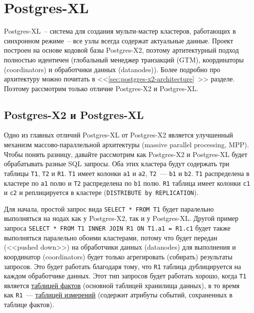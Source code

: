 \section{Postgres-XL}
\label{sec:postgres-xl}

Postgres-XL~-- система для создания мульти-мастер кластеров, работающих в синхронном режиме~-- все узлы всегда содержат актуальные данные. Проект построен на основе кодовой базы Postgres-X2, поэтому артитектурный подход полностью идентичен (глобальный менеджер транзакций (GTM), координаторы (coordinators) и обработчики данных (datanodes)). Более подробно про архитектуру можно почитать в <<\ref{sec:postgres-x2-architecture}~>> разделе. Поэтому рассмотрим только отличие Postgres-X2 и Postgres-XL.


\subsection{Postgres-X2 и Postgres-XL}

Одно из главных отличий Postgres-XL от Postgres-X2 является улучшенный механизм массово-параллельной архитектуры (massive parallel processing, MPP). Чтобы понять разницу, давайте рассмотрим как Postgres-X2 и Postgres-XL будет обрабатывать разные SQL запросы. Оба этих кластера будут содержать три таблицы \lstinline!T1!, \lstinline!T2! и \lstinline!R1!. \lstinline!T1! имеет колонки \lstinline!a1! и \lstinline!a2!, \lstinline!T2!~--- \lstinline!b1! и \lstinline!b2!. \lstinline!T1! распределена в кластере по \lstinline!a1! полю и \lstinline!T2! распределена по \lstinline!b1! полю. \lstinline!R1! таблица имеет колонки \lstinline!c1! и \lstinline!c2! и реплицируется в кластере (\lstinline!DISTRIBUTE by REPLICATION!).

Для начала, простой запрос вида \lstinline!SELECT * FROM T1! будет паралельно выполняться на нодах как у Postgres-X2, так и у Postgres-XL. Другой пример запроса \lstinline!SELECT * FROM T1 INNER JOIN R1 ON T1.a1 = R1.c1! будет также выполняться паралельно обоими кластерами, потому что будет передан (<<pushed down>>) на обработчики данных (datanodes) для выполнения и координатор (coordinators) будет только агрегировать (собирать) результаты запросов. Это будет работать благодаря тому, что \lstinline!R1! таблица дублицируется на каждом обработчике данных. Этот тип запросов будет работать хорошо, когда \lstinline!T1! является \href{https://en.wikipedia.org/wiki/Fact\_table}{таблицей фактов} (основной таблицей хранилища данных), в то время как \lstinline!R1!~--- \href{https://en.wikipedia.org/wiki/Dimension\_(data\_warehouse)#Dimension\_table}{таблицей измерений} (содержит атрибуты событий, сохраненных в таблице фактов).

